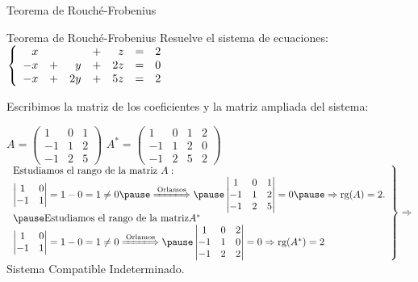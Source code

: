 \documentclass[9pt]{beamer}
\newenvironment{sistematres}{\left\lbrace \begin{array}{rrrrrrr}}{\end{array} \right.}
\begin{document}
\begin{frame}{Teorema de Rouché-Frobenius}
\begin{exampleblock}{Teorema de Rouché-Frobenius}
Resuelve el sistema de ecuaciones:
$\begin{sistematres}
x & &&+&z&=&2 \\
-x&+&y&+&2z&=&0 \\
-x&+&2y&+&5z&=&2
\end{sistematres} $
\end{exampleblock}
\pause
Escribimos la matriz de los coeficientes y la matriz ampliada del sistema:

$A=\begin{pmatrix}
1 & 0 & 1 \\
-1 & 1 & 2 \\
-1 & 2 & 5 
\end{pmatrix}$ $A^*=\begin{pmatrix}
1 & 0 & 1 & 2 \\
-1 & 1 & 2 & 0 \\
-1 & 2 & 5 & 2
\end{pmatrix}$
\pause
$\left. \begin{array}{l}
\text{Estudiamos el rango de la matriz } A:\\
\begin{vmatrix}
1 & 0 \\
-1 & 1
\end{vmatrix}=1-0=1 \neq 0 
\pause
\xLongrightarrow{\text{Orlamos}}
\pause
\begin{vmatrix}
1 & 0 & 1 \\
-1 & 1 & 2 \\
-1 & 2 & 5 
\end{vmatrix}=0 
\pause
 \Rightarrow \text{rg}(A)=2.\\
\pause
\text{Estudiamos el rango de la matriz} A^*\\

\begin{vmatrix}
1 & 0 \\
-1 & 1
\end{vmatrix}=1-0=1 \neq 0 
\xLongrightarrow{\text{Orlamos}}
\pause
\begin{vmatrix}
1 & 0 & 2 \\
-1 & 1 & 0 \\
-1 & 2 & 2 
\end{vmatrix}=0 
\Rightarrow \text{rg}(A^*)=2
\end{array} \right\rbrace \Rightarrow $ Sistema Compatible Indeterminado.

\end{frame}
\end{document}
